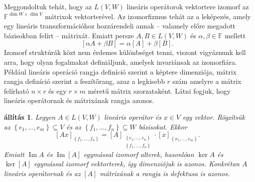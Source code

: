 \documentclass[9pt, showtrims]{memoir}
\theoremstyle{plain}
\newtheorem{proposition}{állítás}[section]
\theoremstyle{remark}
\theoremstyle{definition}
\renewcommand{\mathbf}{\mathbb}
\DeclareMathOperator{\im}{Im}
\begin{document}
Meggondoltuk tehát, hogy az $L\left( V,W \right)$ lineáris operátorok vektortere izomorf az
$\mathbf{F}^{\dim W\times \dim V}$ mátrixok vektorterével. 
Az izomorfizmus tehát az a leképezés, 
amely egy lineáris transzformációhoz hozzárendeli annak 
-- valamely előre megadott bázisokban felírt -- 
mátrixát.
Emiatt persze $A,B\in L\left( V,W \right)$ és $\alpha,\beta\in\mathbf{F}$ mellett
\begin{equation}\label{eq:vt}
    \left[ \alpha A+\beta B \right]=\alpha\left[ A \right]+\beta\left[ B \right].
\end{equation}
Izomorf struktúrák közt nem érdemes különbséget tenni, viszont vigyáznunk kell arra,
hogy olyan fogalmakat definiáljunk, amelyek invariánsak az izomorfiára.
Például lineáris operáció rangja definíció szerint a képtere dimenziója, 
mátrix rangja definíció szerint a feszítőrang, azaz a legkisebb 
$r$ szám amelyre a mátrix felírható $n\times r$ és egy $r\times m$ méretű mátrix szorzataként.
Látni fogjuk, hogy lineáris operátornak és mátrixának rangja azonos.
\begin{proposition}
    Legyen $A\in L\left( V,W \right)$ lineáris operátor és $x\in V$ egy vektor.
    Rögzítsük az $\left\{ e_1,\dots,e_m \right\}\subseteq V$ és az $\left\{ f_1,\dots,f_n \right\}\subseteq W$ bázisokat.
    Ekkor 
    \[
        [Ax]_{\left\{ f_1,\dots,f_n \right\}}
        =
        [A]_{\substack{\left\{ e_1,\dots,e_n \right\}\\ \left\{ f_1,\dots,f_n \right\}}}
        \cdot 
        [x]_{\left\{ x_1,\dots,e_m \right\}}.
    \]
    Emiatt $\im A$ és $\im[A]$ egymással izomorf alterek, hasonlóan $\ker A$ és $\ker[A]$ egymással
    izomorf vektorterek, így dimenziójuk is azonos.
    Konkrétan $A$ lineáris operátornak és az $[A]$ mátrixának a rangja is defektusa is azonos.
\end{proposition}
\end{document}
